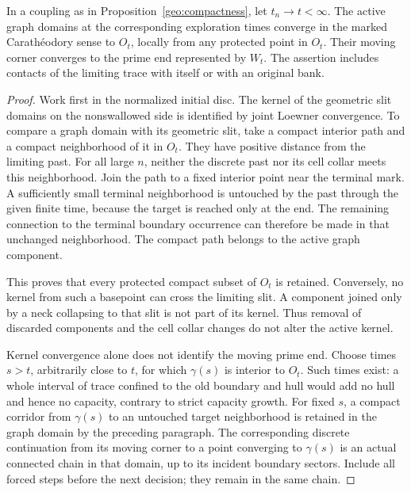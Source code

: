 \begin{lemma}
\label{geo:active}
In a coupling as in Proposition~\ref{geo:compactness}, let
\(t_n\to t<\infty\). The active graph domains at the corresponding
exploration times converge in the marked Carath\'eodory sense to
\(O_t\), locally from any protected point in \(O_t\). Their moving
corner converges to the prime end represented by \(W_t\).
The assertion includes contacts of the limiting trace with itself or
with an original bank.
\end{lemma}

\begin{proof}
Work first in the normalized initial disc. The kernel of the geometric
slit domains on the nonswallowed side is identified by joint
Loewner convergence. To compare a graph domain with its geometric
slit, take a compact interior path and a compact neighborhood of it
in \(O_t\). They have positive distance from the limiting past.
For all large \(n\), neither the discrete past nor its cell collar
meets this neighborhood. Join the path to a fixed interior point
near the terminal mark. A sufficiently small terminal neighborhood
is untouched by the past through the given finite time, because
the target is reached only at the end. The remaining connection to
the terminal boundary occurrence can therefore be made in that
unchanged neighborhood. The compact path belongs to the active
graph component.

This proves that every protected compact subset of \(O_t\) is retained.
Conversely, no kernel from such a basepoint can cross the limiting
slit. A component joined only by a neck collapsing to that slit is
not part of its kernel. Thus removal of discarded components and
the cell collar changes do not alter the active kernel.

Kernel convergence alone does not identify the moving prime end.
Choose times \(s>t\), arbitrarily close to \(t\), for which
\(\gamma(s)\) is interior to \(O_t\). Such times exist: a whole
interval of trace confined to the old boundary and hull would add
no hull and hence no capacity, contrary to strict capacity growth.
For fixed \(s\), a compact corridor from \(\gamma(s)\) to an
untouched target neighborhood is retained in the graph domain by
the preceding paragraph. The corresponding discrete continuation
from its moving corner to a point converging to \(\gamma(s)\) is
an actual connected chain in that domain, up to its incident
boundary sectors. Include all forced steps before the next
decision; they remain in the same chain.


\end{proof}

